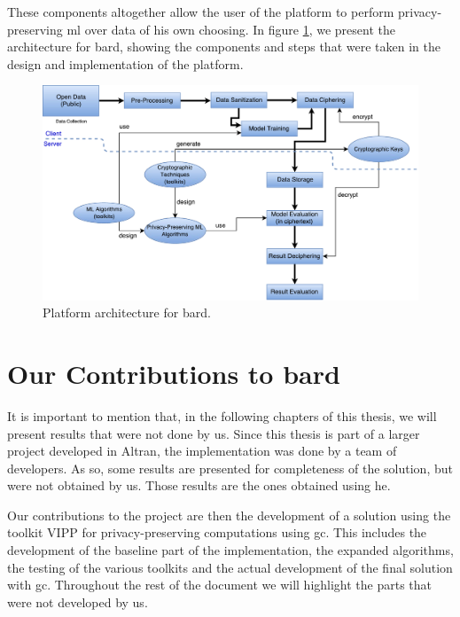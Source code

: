 These components altogether allow the user of the platform to perform privacy-preserving \ac{ml} over data of his own choosing.
In figure \ref{fig:bard-architecture}, we present the architecture for \ac{bard}, showing the components and steps that were taken in the design and implementation of the platform.

\begin{figure}[H]
\centering
\label{fig:bard-architecture}
\includegraphics[width=1\textwidth]{images/BARDArchitecture.pdf}
\caption{Platform architecture for \acs{bard}.}
\end{figure}

\section{Our Contributions to \acs{bard}}
\label{sec:MyContributions}

It is important to mention that, in the following chapters of this thesis, we will present results that were not done by us. Since this thesis is part of a larger project developed in Altran, the implementation was done by a team of developers. As so, some results are presented for completeness of the solution, but were not obtained by us. Those results are the ones obtained using \ac{he}.

Our contributions to the project are then the development of a solution using the toolkit VIPP for privacy-preserving computations using \ac{gc}. This includes the development of the baseline part of the implementation, the expanded algorithms, the testing of the various toolkits and the actual development of the final solution with \ac{gc}. Throughout the rest of the document we will highlight the parts that were not developed by us. 

